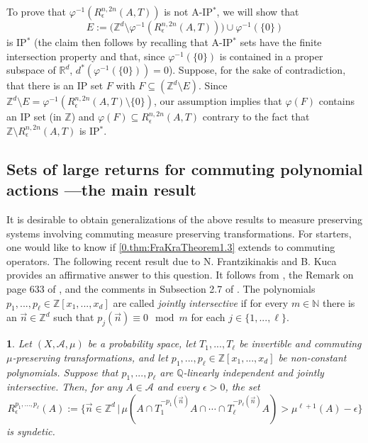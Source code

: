 \documentclass[11pt,american,preprint]{elsarticle}
\numberwithin{equation}{section}
\theoremstyle{plain}
\newtheorem{thm}{\protect\theoremname}[section]
\theoremstyle{plain*}
\theoremstyle{plain}
\theoremstyle{plain*}
\theoremstyle{plain}
\theoremstyle{plain*}
\theoremstyle{remark}
\theoremstyle{remark*}
\theoremstyle{remark}
\theoremstyle{remark*}
\theoremstyle{remark}
\theoremstyle{remark*}
\theoremstyle{plain}
\theoremstyle{definition}
\theoremstyle{plain}
\theoremstyle{plain} %
\providecommand{\theoremname}{Theorem}
\newcommand{\R}{\mathbb{R}}
\newcommand{\N}{\mathbb{N}}
\newcommand{\Q}{\mathbb{Q}}
\newcommand{\Z}{\mathbb{Z}}
\begin{document}
\begin{enumerate}[(1)]
To prove that $\varphi^{-1}(R_\epsilon^{n,2n}(A,T))$  is not A-IP$^*$, we will show that 
$$E:=\Big(\Z^d\setminus\varphi^{-1}(R_\epsilon^{n,2n}(A,T))\Big)\cup \varphi^{-1}(\{0\})$$ 
is IP$^*$ (the claim then follows by recalling that A-IP$^*$ sets have the finite intersection property and that, since $\varphi^{-1}(\{0\})$ is contained in a proper subspace of $\R^d$,  $d^*(\varphi^{-1}(\{0\}))=0$). Suppose, for the sake of contradiction, that there is an IP set $F$ with $F\subseteq (\Z^d\setminus E)$. Since $\Z^d\setminus E=\varphi^{-1}(R_\epsilon^{n,2n}(A,T)\setminus\{0\})$, our assumption implies that $\varphi(F)$ contains an IP set (in $\Z$) and $\varphi(F)\subseteq R_\epsilon^{n,2n}(A,T)$ contrary to the fact that $\Z\setminus R_\epsilon^{n,2n}(A,T)$ is IP$^*$. 
\end{enumerate}
\subsection{Sets of large returns for commuting polynomial actions ---the  main result}
It is desirable to obtain generalizations of the above results to measure preserving systems involving commuting measure preserving transformations. For starters, one would like to know if \cref{0.thm:FraKraTheorem1.3} extends to commuting operators. 
The following  recent result due to N. Frantzikinakis and B. Kuca provides an affirmative answer to this question. It  follows from \cite[Corollary 2.11]{FraKuJoinErgForIndependentPolys}, the Remark on page 633 of \cite{FraKuJoinErgForIndependentPolys}, and the comments in Subsection 2.7 of \cite{FraKuJoinErgForIndependentPolys}.
The polynomials $p_1,...,p_\ell\in\Z[x_1,...,x_d]$ are called \textit{jointly intersective} if for every $m\in\N$ there is an $\vec n\in \Z^d$ such that $p_j(\vec n)\equiv 0\mod m$ for each $j\in\{1,...,\ell\}$.
\begin{thm}\label{0.thm:FraKu} Let $(X,\mathcal A,\mu)$ be a probability space, let $T_1,...,T_\ell$ be invertible and commuting $\mu$-preserving transformations, and   let $p_1,...,p_\ell\in\Z[x_1,...,x_d]$ be non-constant polynomials. Suppose that $p_1,...,p_\ell$ are $\Q$-linearly independent and jointly intersective. Then, for any $A\in\mathcal A$ and every $\epsilon>0$, the set 
\begin{equation}%
R_\epsilon^{p_1,...,p_\ell}(A):=\{\vec n\in\Z^d\,|\,\mu(A\cap T_1^{-p_1(\vec n)}A\cap \cdots \cap T
_\ell^{-p_\ell(\vec n)}A)>\mu^{\ell+1}(A)-\epsilon \}
\end{equation}
is syndetic.
\end{thm}
\end{document}
